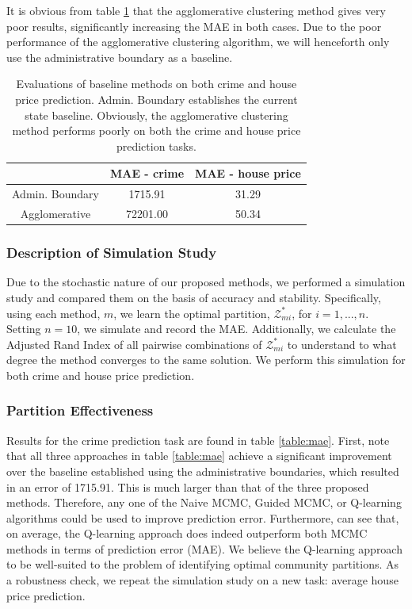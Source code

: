 It is obvious from table \ref{baseline:table} that the agglomerative clustering method gives very poor results, significantly increasing the MAE in both cases. Due to the poor performance of the agglomerative clustering algorithm, we will henceforth only use the administrative boundary as a baseline. 
\begin{center}
\begin{table}[h!]
\begin{tabular}{ |c|c|c| } 
\hline
  & MAE - crime  & MAE - house price\\
 \hline
 Admin. Boundary & 1715.91 & 31.29 \\ 
 \hline
 Agglomerative &72201.00 & 50.34 \\
 \hline
\end{tabular}
\caption{Evaluations of baseline methods on both crime and house price prediction. Admin. Boundary establishes the current state baseline. Obviously, the agglomerative clustering method performs poorly on both the crime and house price prediction tasks.}
\label{baseline:table}
\end{table}
\end{center}




\subsubsection{Description of Simulation Study}
Due to the stochastic nature of our proposed methods, we performed a simulation study and compared them on the basis of accuracy and stability. Specifically, using each method, $m$, we learn the  optimal partition, $\mathcal{Z}^*_{mi}$, for $i=1,...,n$. Setting $n=10$, we simulate and record the MAE. Additionally, we calculate the Adjusted Rand Index of all pairwise combinations of $\mathcal{Z}^*_{mi}$ to understand to what degree the method converges to the same solution. We perform this simulation for both crime and house price prediction. 



\subsubsection{Partition Effectiveness}\label{error:section}


\label{Crime} Results for the crime prediction task are found in table \ref{table:mae}. First, note that all three approaches in table \ref{table:mae} achieve a significant improvement over the baseline established using the administrative boundaries, which resulted in an error of 1715.91. This is much larger than that of the three proposed methods. Therefore, any one of the Naive MCMC, Guided MCMC, or Q-learning algorithms could be used to improve prediction error. Furthermore, can see that, on average, the Q-learning approach does indeed outperform both MCMC methods in terms of prediction error (MAE). We believe the Q-learning approach to be well-suited to the problem of identifying optimal community partitions. As a robustness check, we repeat the simulation study on a new task: average house price prediction. 

